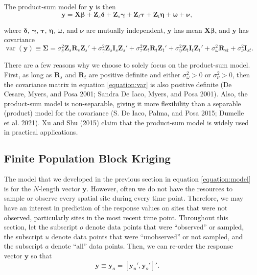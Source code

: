 \documentclass[]{article}    %
\begin{document}
The product-sum model for \(\mathbf{y}\) is then \mbox{}
\begin{equation} \label{equation:model}
\mathbf{y} = \mathbf{X} \bm{\beta} + \mathbf{Z}_{s} \bm{\delta} + \mathbf{Z}_{s} \bm{\gamma} + \mathbf{Z}_t \bm{\tau} + \mathbf{Z}_t \bm{\eta} + \bm{\omega} + \bm{\nu},
\end{equation}

\noindent where \(\bm{\delta}\), \(\bm{\gamma}\), \(\bm{\tau}\),
\(\bm{\eta}\), \(\bm{\omega}\), and \(\bm{\nu}\) are mutually
independent, \(\mathbf{y}\) has mean \(\mathbf{X} \bm{\beta}\), and
\(\mathbf{y}\) has covariance \mbox{} \begin{equation}
\label{equation:var}
\mathop{\mathrm{{var}}}(\mathbf{y}) \equiv \bm{\Sigma} = \sigma^2_{\delta} \mathbf{Z}_{s} \mathbf{R}_{s} \mathbf{Z}_{s}' + \sigma^2_{\gamma} \mathbf{Z}_{s} \mathbf{I}_{s} \mathbf{Z}_{s}' + \sigma^2_{\tau} \mathbf{Z}_t \mathbf{R}_t \mathbf{Z}_t'+ \sigma^2_{\eta} \mathbf{Z}_t \mathbf{I}_t \mathbf{Z}_t' + \sigma^2_{\omega} \mathbf{R}_{st} + \sigma^2_{\nu} \mathbf{I}_{st}.
\end{equation}

\noindent There are a few reasons why we choose to solely focus on the
product-sum model. First, as long as \(\mathbf{R}_s\) and
\(\mathbf{R}_t\) are positive definite and either
\(\sigma^2_{\omega} > 0\) or \(\sigma^2_{\nu} > 0\), then the covariance
matrix in equation \ref{equation:var} is also positive definite (De
Cesare, Myers, and Posa 2001; Sandra De Iaco, Myers, and Posa 2001).
Also, the product-sum model is non-separable, giving it more flexibility
than a separable (product) model for the covariance (S. De Iaco, Palma,
and Posa 2015; Dumelle et al. 2021). Xu and Shu (2015) claim that the
product-sum model is widely used in practical applications.

\hypertarget{subsection:fpbk}{%
\subsection{Finite Population Block Kriging}\label{subsection:fpbk}}

The model that we developed in the previous section in equation
\ref{equation:model} is for the \(N\)-length vector \(\mathbf{y}\).
However, often we do not have the resources to sample or observe every
spatial site during every time point. Therefore, we may have an interest
in prediction of the response values on sites that were not observed,
particularly sites in the most recent time point. Throughout this
section, let the subscript \(o\) denote data points that were
``observed'' or sampled, the subscript \(u\) denote data points that
were ``unobserved'' or not sampled, and the subscript \(a\) denote
``all'' data points. Then, we can re-order the response vector
\(\mathbf{y}\) so that \mbox{} \begin{equation} \label{equation:ordered}
\mathbf{y} \equiv \mathbf{y}_a = [\mathbf{y}_u', \mathbf{y}_o']'.
\end{equation}
\end{document}
